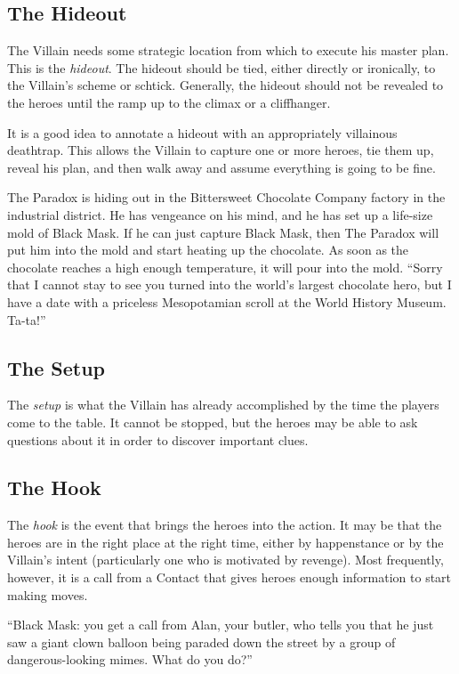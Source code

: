 \documentclass[letterpaper]{report}
\begin{document}
\subsection*{The Hideout}
The Villain needs some strategic location from which to execute
his master plan. This is the \emph{hideout}.
The hideout should be tied, either directly or ironically,
to the Villain's scheme or schtick.
Generally, the hideout
should not be revealed to the heroes until the ramp up to the climax
or a cliffhanger.

It is a good idea to annotate a hideout with an appropriately
villainous deathtrap. This allows the Villain to capture one or
more heroes, tie them up, reveal his plan, and then walk away
and assume everything is going to be fine.

\begin{example}
  The Paradox is hiding out in the Bittersweet Chocolate Company
  factory in the industrial district. He has vengeance on his mind,
  and he has set up a life-size mold of Black Mask. If he can
  just capture Black Mask, then The Paradox will put him into the mold
  and start heating up the chocolate.
  As soon as the chocolate reaches a high enough temperature, it will
  pour into the mold. ``Sorry that I cannot stay to see you turned
  into the world's largest chocolate hero, but I have a date with
  a priceless Mesopotamian scroll at the World History Museum. Ta-ta!''  
\end{example}

\subsection*{The Setup}
The \emph{setup} is what the Villain has already accomplished by the
time the players come to the table. It cannot be stopped, but the heroes
may be able to ask questions about it in order to discover important
clues.

\subsection*{The Hook}
\label{sec:hook}
The \emph{hook} is the event that brings the heroes into the action.
It may be that the heroes are in the right place at the right time,
either by happenstance or by the Villain's intent (particularly
one who is motivated by revenge).
Most frequently, however, it is a call from a Contact that gives
heroes enough information to start making moves.

\begin{example}
  ``Black Mask: you get a call from Alan, your butler, who tells you
  that he just saw a giant clown balloon being paraded down the
  street by a group of dangerous-looking mimes. What do you do?''
\end{example}
\end{document}
